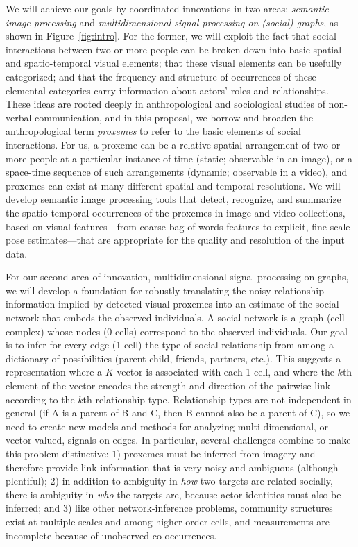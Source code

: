 We will achieve our goals by coordinated innovations in two areas: \emph{semantic image processing} and \emph{multidimensional signal processing on (social) graphs}, as shown in Figure~\ref{fig:intro}. For the former, we will exploit the fact that social interactions between two or more people can be broken down into basic spatial and spatio-temporal visual elements; that these visual elements can be usefully categorized; and that the frequency and structure of occurrences of these elemental categories carry information about actors' roles and relationships. These ideas are rooted deeply in anthropological and sociological studies of non-verbal communication, and in this proposal, we borrow and broaden the anthropological term \emph{proxemes} to refer to the basic elements of social interactions. For us, a proxeme can be a relative spatial arrangement of two or more people at a particular instance of time (static; observable in an image), or a space-time sequence of such arrangements (dynamic; observable in a video), and proxemes can exist at many different spatial and temporal resolutions. We will develop semantic image processing tools that detect, recognize, and summarize the spatio-temporal occurrences of the proxemes in image and video collections, based on visual features---from coarse bag-of-words features to explicit, fine-scale pose estimates---that are appropriate for the quality and resolution of the input data.

For our second area of innovation, multidimensional signal processing on graphs, we will develop a foundation for robustly translating the noisy relationship information implied by detected visual proxemes into an estimate of the social network that embeds the observed individuals. A social network is a graph (cell complex) whose nodes (0-cells) correspond to the observed individuals. Our goal is to infer for every edge (1-cell) the type of social relationship from among a dictionary of possibilities (parent-child, friends, partners, etc.). This suggests a representation where a $K$-vector is associated with each 1-cell, and where the $k$th element of the vector encodes the strength and direction of the pairwise link according to the $k$th relationship type. Relationship types are not independent in general (if A is a parent of B and C, then B cannot also be a parent of C), so we need to create new models and methods for analyzing multi-dimensional, or vector-valued, signals on edges. In particular, several challenges combine to make this problem distinctive: 1) proxemes must be inferred from imagery and therefore provide link information that is very noisy and ambiguous (although plentiful); 2) in addition to ambiguity in \emph{how} two targets are related socially, there is ambiguity in \emph{who} the targets are, because actor identities must also be inferred; and 3) like other network-inference problems, community structures exist at multiple scales and among higher-order cells, and measurements are incomplete because of unobserved co-occurrences.

